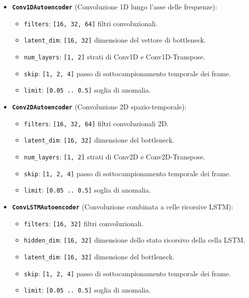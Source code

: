\begin{itemize}
\begin{itemize}
\begin{itemize}
			\item[\(\ast\)] \texttt{skip}: \texttt{[1, 2, 4]} passo di sottocampionamento temporale dei frame.
			\item[\(\ast\)] \texttt{limit}: \texttt{[0.05 .. 0.5]} soglia di anomalia.
		\end{itemize}

		\item[\(\bullet\)] \textbf{\texttt{Conv1DAutoencoder}} (Convoluzione 1D lungo l'asse delle frequenze):
		\begin{itemize}
			\item[\(\ast\)] \texttt{filters}: \texttt{[16, 32, 64]} filtri convoluzionali.
			\item[\(\ast\)] \texttt{latent\_dim}: \texttt{[16, 32]} dimensione del vettore di bottleneck.
			\item[\(\ast\)] \texttt{num\_layers}: \texttt{[1, 2]} strati di Conv1D e Conv1D-Transpose.
			\item[\(\ast\)] \texttt{skip}: \texttt{[1, 2, 4]} passo di sottocampionamento temporale dei frame.
			\item[\(\ast\)] \texttt{limit}: \texttt{[0.05 .. 0.5]} soglia di anomalia.
		\end{itemize}

		\item[\(\bullet\)] \textbf{\texttt{Conv2DAutoencoder}} (Convoluzione 2D spazio-temporale):
		\begin{itemize}
			\item[\(\ast\)] \texttt{filters}: \texttt{[16, 32, 64]} filtri convoluzionali 2D.
			\item[\(\ast\)] \texttt{latent\_dim}: \texttt{[16, 32]} dimensione del bottleneck.
			\item[\(\ast\)] \texttt{num\_layers}: \texttt{[1, 2]} strati di Conv2D e Conv2D-Transpose.
			\item[\(\ast\)] \texttt{skip}: \texttt{[1, 2, 4]} passo di sottocampionamento temporale dei frame.
			\item[\(\ast\)] \texttt{limit}: \texttt{[0.05 .. 0.5]} soglia di anomalia.
		\end{itemize}

		\item[\(\bullet\)] \textbf{\texttt{ConvLSTMAutoencoder}} (Convoluzione combinata a celle ricorsive LSTM):
		\begin{itemize}
			\item[\(\ast\)] \texttt{filters}: \texttt{[16, 32]} filtri convoluzionali.
			\item[\(\ast\)] \texttt{hidden\_dim}: \texttt{[16, 32]} dimensione dello stato ricorsivo della cella LSTM.
			\item[\(\ast\)] \texttt{latent\_dim}: \texttt{[16, 32]} dimensione del bottleneck.
			\item[\(\ast\)] \texttt{skip}: \texttt{[1, 2, 4]} passo di sottocampionamento temporale dei frame.
			\item[\(\ast\)] \texttt{limit}: \texttt{[0.05 .. 0.5]} soglia di anomalia.
		\end{itemize}
	\end{itemize}
		\end{itemize}

